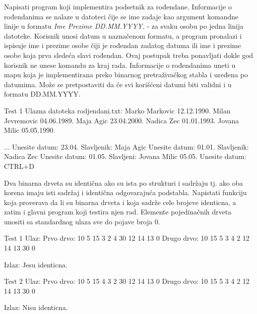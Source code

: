 \begin{Exercise}[label=706]
Napisati program koji implementira podsetnik za rođendane. Informacije o rođendanima se nalaze u datoteci čije se ime zadaje kao argument komandne linije u formatu \textit{Ime Prezime DD.MM.YYYY.} - za svaku osobu po jedna linija datoteke. Korisnik unosi datum u naznačenom formatu, a program pronalazi i ispisuje ime i prezime osobe čiji je rođendan zadatog datuma ili ime i prezime osobe koja prva sledeća slavi rođendan. Ovaj postupak treba ponavljati dokle god korisnik ne unese komandu za kraj rada. Informacije o rođendanima uneti u mapu koja je implementirana preko binarnog pretraživačkog stabla i uređena po datumima. Može se pretpostaviti da će svi korišćeni datumi biti validni i u formatu DD.MM.YYYY.
\begin{maxitest}
\begin{test}{Test 1}
Ulazna datoteka rodjendani.txt:
Marko Markovic 12.12.1990.
Milan Jevremovic 04.06.1989.
Maja Agic 23.04.2000.
Nadica Zec 01.01.1993.
Jovana Milic 05.05.1990.

...
Unesite datum: 23.04.
Slavljenik: Maja Agic 
Unesite datum: 01.01.
Slavljenik: Nadica Zec
Unesite datum: 01.05.
Slavljeni: Jovana Milic 05.05.
Unesite datum: CTRL+D
\end{test}
\end{maxitest}

\end{Exercise}


\begin{Exercise}[label=707]
Dva binarna drveta su identična ako su ista po strukturi i sadržaju tj. ako oba korena imaju isti sadržaj i identična odgovarajuća podstabla. Napistati funkciju  koja proverava da li su binarna drveta  i  koja sadrže cele brojeve identicna, a zatim i glavni program koji testira njen rad. Elemente pojedinačnih drveta unositi sa standardnog ulaza sve do pojave broja 0.

\begin{maxitest}
\begin{test}{Test 1}
Ulaz:
Prvo drvo: 10 5 15 3 2 4 30 12 14 13 0
Drugo drvo: 10 15 5 3 4 2 12 14 13 30 0

Izlaz:
Jesu identicna.
\end{test}
\end{maxitest}

\begin{maxitest}
\begin{test}{Test 2}
Ulaz:
Prvo drvo: 10 5 15 4 3 2 30 12 14 13 0
Drugo drvo: 10 15 5 3 4 2 12 14 13 30 0

Izlaz:
Nisu identicna.
\end{test}
\end{maxitest}

\end{Exercise}


